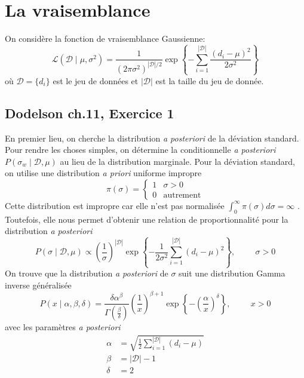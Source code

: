 \documentclass{article}
\numberwithin{equation}{section}
\begin{document}
\section{La vraisemblance}


On considère la fonction de vraisemblance Gaussienne:
\[
        \mathcal{L}(\mathcal{D} \mid \mu, \sigma^2) 
        = \frac{1}{(2 \pi \sigma^2)^{|\mathcal{D}|/2}}
        \exp \left\{ -\sum_{i=1}^{|\mathcal{D}|}\frac{(d_i - \mu)^{2} }{2 \sigma^2} \right\}
\]
où $\mathcal{D} = \{d_i \}$ est le jeu de données et $|\mathcal{D}|$ est 
la taille du jeu de donnée.

\subsection{Dodelson ch.11, Exercice 1}
En premier lieu, on cherche la distribution \textit{a posteriori} de 
la déviation standard. Pour rendre les choses simples, on détermine 
la conditionnelle \textit{a posteriori} $P(\sigma_w \mid \mathcal{D}, \mu)$ 
au lieu de la distribution marginale. Pour la déviation standard, on 
utilise une distribution \textit{a priori} uniforme impropre
\[
        \pi(\sigma) = 
        \left\{ 
\begin{matrix}
        1 & \sigma > 0 \\
        0 & \text{autrement}
\end{matrix}
        \right.
\]
Cette distribution est impropre car elle n'est pas normalisée 
$\int_{0}^{\infty }\pi(\sigma) d\sigma = \infty $
. Toutefois, 
elle nous permet d'obtenir une relation de proportionnalité pour 
la distribution \textit{a posteriori} 
\[
        P(\sigma \mid \mathcal{D}, \mu) \propto
        \left(\frac{1}{\sigma}  \right)^{|\mathcal{D}|} 
        \exp
        \left\{ -\frac{1}{2\sigma^2}\sum_{i=1}^{|\mathcal{D}|}
        (d_i - \mu)^{2}\right\}, \hspace{1cm} \sigma > 0
\]
On trouve que la distribution \textit{a posteriori} de $\sigma$ suit 
une distribution Gamma inverse généralisée
\[
        P(x \mid \alpha, \beta, \delta ) = 
        \frac{\delta \alpha^{\beta}}{\Gamma(\frac{\beta}{\delta })} 
        \left(\frac{1}{x}\right)^{\beta + 1}
        \exp \left\{ - \left(\frac{\alpha}{x}\right)^{\delta } \right\}, \hspace{1cm} x > 0
\]
avec les paramètres \textit{a posteriori}
\begin{align*}
        \alpha &= \sqrt{\frac{1}{2}\sum_{i=1}^{|\mathcal{D}|}(d_i - \mu)} \\
        \beta &= |\mathcal{D}| - 1 \\
        \delta &= 2
\end{align*}
\end{document}
